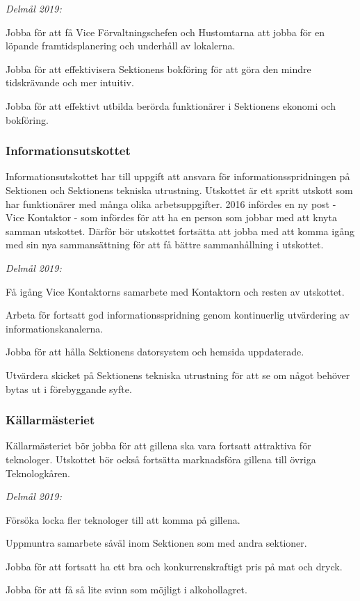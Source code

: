 \documentclass[../_main/handlingar.tex]{subfiles}
\begin{document}
\emph{Delmål 2019:}
\begin{dashlist}
    \item Jobba för att få Vice Förvaltningschefen och Hustomtarna att jobba för en löpande framtidsplanering och underhåll av lokalerna. 
    \item Jobba för att effektivisera Sektionens bokföring för att göra den mindre tidskrävande och mer intuitiv. 
    \item Jobba för att effektivt utbilda berörda funktionärer i Sektionens ekonomi och bokföring.
\end{dashlist}

\newpage

\subsubsection*{Informationsutskottet}
Informationsutskottet har till uppgift att ansvara för informationsspridningen på Sektionen och Sektionens tekniska utrustning. Utskottet är ett spritt utskott som har funktionärer med många olika arbetsuppgifter. 2016 infördes en ny post - Vice Kontaktor - som infördes för att ha en person som jobbar med att knyta samman utskottet. Därför bör utskottet fortsätta att jobba med att komma igång med sin nya sammansättning för att få bättre sammanhållning i utskottet.

\emph{Delmål 2019:}
\begin{dashlist}
    \item Få igång Vice Kontaktorns samarbete med Kontaktorn och resten av utskottet.
    \item Arbeta för fortsatt god informationsspridning genom kontinuerlig utvärdering av informationskanalerna.
    \item Jobba för att hålla Sektionens datorsystem och hemsida uppdaterade.
    \item Utvärdera skicket på Sektionens tekniska utrustning för att se om något behöver bytas ut i förebyggande syfte.
\end{dashlist}

\subsubsection*{Källarmästeriet}
Källarmästeriet bör jobba för att gillena ska vara fortsatt attraktiva för teknologer. Utskottet bör också fortsätta marknadsföra gillena till övriga Teknologkåren. 

\emph{Delmål 2019:}
\begin{dashlist}
    \item Försöka locka fler teknologer till att komma på gillena. 
    \item Uppmuntra samarbete såväl inom Sektionen som med andra sektioner. 
    \item Jobba för att fortsatt ha ett bra och konkurrenskraftigt pris på mat och dryck. 
    \item Jobba för att få så lite svinn som möjligt i alkohollagret.     
\end{dashlist}
\end{document}
